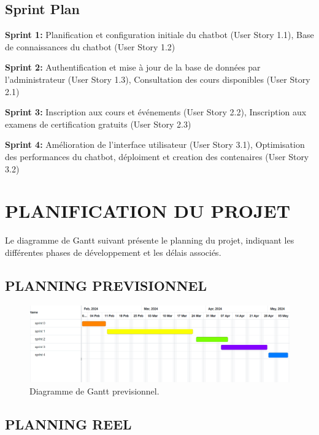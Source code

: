 \documentclass[a4paper, 11pt, openany]{report}
\begin{document}
\subsection{Sprint Plan}

\textbf{Sprint 1:} Planification et configuration initiale du chatbot (User Story 1.1), Base de connaissances du chatbot (User Story 1.2)

\textbf{Sprint 2:} Authentification et mise à jour de la base de données par l'administrateur (User Story 1.3), Consultation des cours disponibles (User Story 2.1)

\textbf{Sprint 3:} Inscription aux cours et événements (User Story 2.2), Inscription aux examens de certification gratuits (User Story 2.3)

\textbf{Sprint 4:} Amélioration de l'interface utilisateur (User Story 3.1), Optimisation des performances du chatbot, déploiment et creation des contenaires (User Story 3.2)


\section{PLANIFICATION DU PROJET}
Le diagramme de Gantt suivant présente le planning du projet, indiquant les différentes phases de développement et les délais associés.



\subsection{PLANNING PREVISIONNEL}

\begin{figure}[h!]
\centering
\includegraphics[width=\textwidth]{gant-prev.png}
\caption{Diagramme de Gantt previsionnel.}
\label{fig:prev-gantt}
\end{figure}


\clearpage





\subsection{PLANNING REEL}
\end{document}
